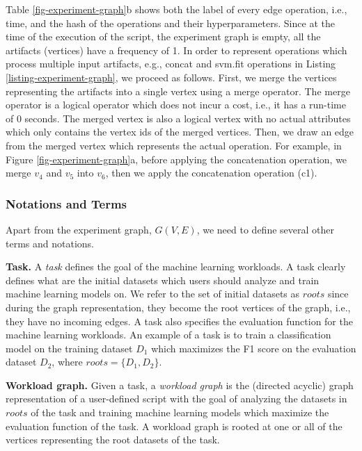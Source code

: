 Table \ref{fig-experiment-graph}b shows both the label of every edge operation, i.e., time, and the hash of the operations and their hyperparameters.
Since at the time of the execution of the script, the experiment graph is empty, all the artifacts (vertices) have a frequency of 1.
In order to represent operations which process multiple input artifacts, e.g., concat and svm.fit operations in Listing \ref{listing-experiment-graph}, we proceed as follows.
First, we merge the vertices representing the artifacts into a single vertex using a merge operator.
The merge operator is a logical operator which does not incur a cost, i.e., it has a run-time of 0 seconds.
The merged vertex is also a logical vertex with no actual attributes which only contains the vertex ids of the merged vertices.
Then, we draw an edge from the merged vertex which represents the actual operation.
For example, in Figure \ref{fig-experiment-graph}a, before applying the concatenation operation, we merge $v_4$ and $v_5$ into $v_6$, then we apply the concatenation operation (c1).
 
\subsubsection{Notations and Terms}\label{notations-terms}
Apart from the experiment graph, $G(V, E)$, we need to define several other terms and notations.

\textbf{Task.} A \textit{task} defines the goal of the machine learning workloads. 
A task clearly defines what are the initial datasets which users should analyze and train machine learning models on. 
We refer to the set of initial datasets as $roots$ since during the graph representation, they become the root vertices of the graph, i.e., they have no incoming edges.
A task also specifies the evaluation function for the machine learning workloads.
An example of a task is to train a classification model on the training dataset $D_1$ which maximizes the F1 score on the evaluation dataset $D_2$, where $roots = \{D_1, D_2\}$.

\textbf{Workload graph.} Given a task, a \textit{workload graph} is the (directed acyclic) graph representation of a user-defined script with the goal of analyzing the datasets in $roots$ of the task and training machine learning models which maximize the evaluation function of the task.
A workload graph is rooted at one or all of the vertices representing the root datasets of the task.

